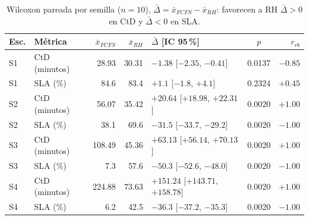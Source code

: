 \documentclass[10pt]{article}
\renewcommand{\footnotesize}{\fontsize{9}{11}\selectfont}
\begin{document}
\begin{table}[htbp]
\centering
\footnotesize
\caption{Wilcoxon pareada por semilla ($n = 10$), $\bar{\Delta} = \bar{x}_{FCFS} - \bar{x}_{RH}$: favorecen a RH
$\bar{\Delta} > 0$ en CtD y $\bar{\Delta} < 0$ en SLA.}
\label{tab:wilcoxon}
\begin{tabular}{@{}ll rr l c r@{}}
\toprule
Esc. & Métrica & $\bar{x}_{FCFS}$ & $\bar{x}_{RH}$ & $\bar{\Delta}$ [IC 95\,\%] & $p$ & $r_{rb}$ \\
\midrule
S1 & CtD (minutos) & 28.93  & 30.31 & $-1.38$ [$-2.35$, $-0.41$]        & 0.0137 & $-0.85$ \\
S1 & SLA (\%)  & 84.6   & 83.4  & $+1.1$ [$-1.8$, $+4.1$]           & 0.2324 & $+0.45$ \\
S2 & CtD (minutos) & 56.07  & 35.42 & $+20.64$ [$+18.98$, $+22.31$]     & 0.0020 & $+1.00$ \\
S2 & SLA (\%)  & 38.1   & 69.6  & $-31.5$ [$-33.7$, $-29.2$]        & 0.0020 & $-1.00$ \\
S3 & CtD (minutos) & 108.49 & 45.36 & $+63.13$ [$+56.14$, $+70.13$]     & 0.0020 & $+1.00$ \\
S3 & SLA (\%)  & 7.3    & 57.6  & $-50.3$ [$-52.6$, $-48.0$]        & 0.0020 & $-1.00$ \\
S4 & CtD (minutos) & 224.88 & 73.63 & $+151.24$ [$+143.71$, $+158.78$]  & 0.0020 & $+1.00$ \\
S4 & SLA (\%)  & 6.2    & 42.5  & $-36.3$ [$-37.2$, $-35.3$]        & 0.0020 & $-1.00$ \\
\bottomrule
\end{tabular}
\end{table}
\end{document}
